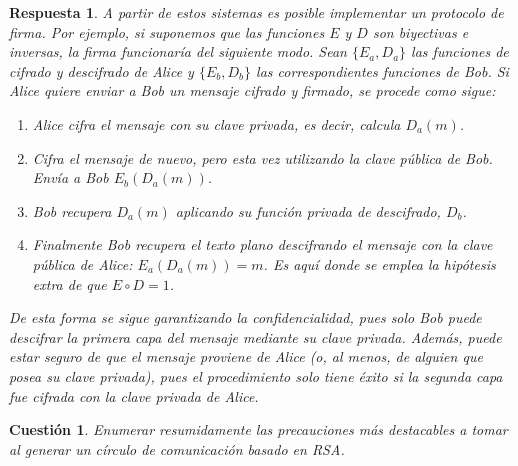 \documentclass[
  a4paper,
  spanish,
  12pt,
]{scrartcl}
\theoremstyle{ejercicio-style}
\newtheorem{ejer}{Cuestión}
\theoremstyle{remark-style}
\newtheorem*{sol}{Respuesta}
\theoremstyle{teorema-style}
\begin{document}
\begin{sol}
  A partir de estos sistemas es posible implementar un protocolo de firma.
  Por ejemplo, si suponemos que las funciones $E$ y $D$ son biyectivas e inversas, la firma funcionaría del siguiente modo. Sean $\{ E_a, D_a \}$ las funciones de cifrado y descifrado de Alice y $\{ E_b, D_b \}$ las correspondientes funciones de Bob. Si Alice quiere enviar a Bob un mensaje cifrado y firmado, se procede como sigue:

  \begin{enumerate}
    \item Alice cifra el mensaje con su clave privada, es decir, calcula $D_a(m)$.
    \item Cifra el mensaje de nuevo, pero esta vez utilizando la clave pública de Bob. Envía a Bob $E_b(D_a(m))$.
    \item Bob recupera $D_a(m)$ aplicando su función privada de descifrado, $D_b$.
    \item Finalmente Bob recupera el texto plano descifrando el mensaje con la clave pública de Alice: $E_a(D_a(m)) = m$. Es aquí donde se emplea la hipótesis extra de que $E \circ D = 1$.
  \end{enumerate}

  De esta forma se sigue garantizando la confidencialidad, pues solo Bob puede descifrar la primera capa del mensaje mediante su clave privada. Además, puede estar seguro de que el mensaje proviene de Alice (o, al menos, de alguien que posea su clave privada), pues el procedimiento solo tiene éxito si la segunda capa fue cifrada con la clave privada de Alice.

\end{sol}


\begin{ejer}
  Enumerar resumidamente las precauciones más destacables a tomar al generar un círculo de comunicación basado en RSA.
\end{ejer}
\end{document}
